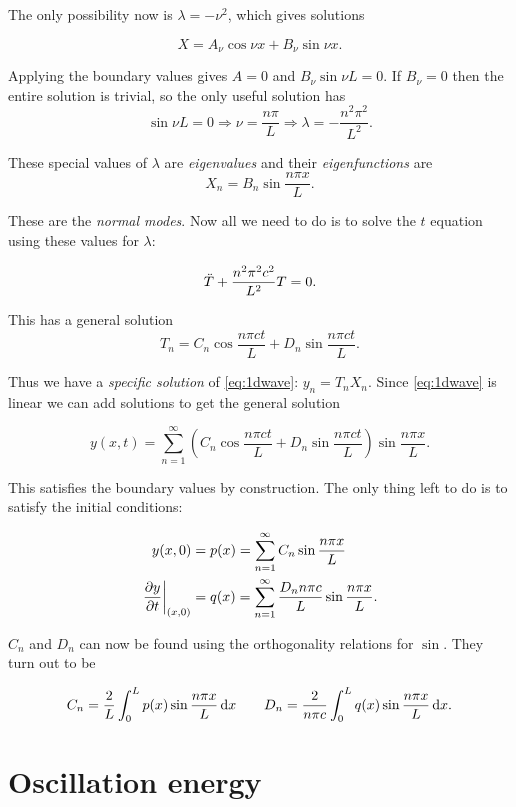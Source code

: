 \documentclass{notes}
\theoremstyle{plain}
\begin{document}
The only possibility now is $\lambda = - \nu^2$, which gives solutions

\[
X = A_\nu \cos \nu x + B_\nu \sin \nu x.
\]

Applying the boundary values gives $A = 0$ and $B_\nu \sin \nu L = 0$.
If $B_\nu = 0$ then the entire solution is trivial, so the only useful
solution has
\[
\sin \nu L = 0 \Rightarrow \nu = \frac{n \pi}{L} \Rightarrow
\lambda = - \frac{n^2 \pi^2}{L^2}.
\] 

These special values of $\lambda$ are \emph{eigenvalues} and their
\emph{eigenfunctions} are
\[
X_n = B_n \sin \frac{n \pi x}{L}.
\]

These are the \emph{normal modes}.  Now all we need to do is to solve
the $t$ equation using these values for $\lambda$:

\[
\Ddot{T} + \frac{n^2 \pi^2 c^2}{L^2} T = 0.
\]

This has a general solution
\[
T_n = C_n \cos \frac{n \pi c t}{L} + D_n \sin \frac{n \pi c t}{L}.
\]

Thus we have a \emph{specific solution} of \eqref{eq:1dwave}: $y_n =
T_n X_n$.  Since \eqref{eq:1dwave} is linear we can add solutions to
get the general solution

\begin{equation}\label{eq:1dwavesoln}
y(x,t) = \sum_{n=1}^\infty \left( C_n \cos \frac{n \pi c t}{L} + D_n
  \sin \frac{n \pi c t}{L} \right) \sin \frac{n \pi x}{L}.
\end{equation}

This satisfies the boundary values by construction.  The only
thing left to do is to satisfy the initial conditions:

\begin{align*}
y(x,0) &= p(x) = \sum_{n=1}^\infty C_n \sin \frac{n \pi x}{L} \\
\left.\frac{\partial y}{\partial t}\right|_{(x,0)} &= q(x)
= \sum_{n=1}^\infty \frac{D_n n \pi c}{L} \sin \frac{n \pi x}{L}.
\end{align*}

$C_n$ and $D_n$ can now be found using the orthogonality relations for
$\sin$.  They turn out to be

\[
C_n = \frac{2}{L} \int_0^L p(x) \sin \frac{n \pi x}{L}\, \mathrm{d} x \qquad
D_n = \frac{2}{n \pi c} \int_0^L q(x) \sin \frac{n \pi x}{L}\, \mathrm{d} x.
\]

\section{Oscillation energy}
\end{document}

